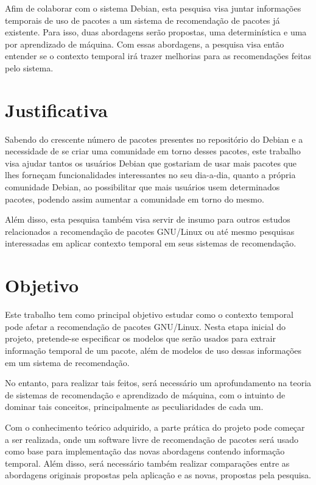 Afim de colaborar com o sistema Debian, esta pesquisa visa juntar informações
temporais de uso de pacotes a um sistema de recomendação de pacotes já existente.
Para isso, duas abordagens serão propostas, uma determinística e uma por aprendizado
de máquina. Com essas abordagens, a pesquisa visa então entender se o contexto temporal
irá trazer melhorias para as recomendações feitas pelo sistema.

\section{Justificativa}

Sabendo do crescente número de pacotes presentes no repositório do Debian e a
necessidade de se criar uma comunidade em torno desses pacotes, este trabalho
visa ajudar tantos os usuários Debian que gostariam de usar mais pacotes que
lhes forneçam funcionalidades interessantes no seu dia-a-dia, quanto a própria
comunidade Debian, ao possibilitar que mais usuários usem determinados pacotes,
podendo assim aumentar a comunidade em torno do mesmo.

Além disso, esta pesquisa também visa servir de insumo para outros estudos
relacionados a recomendação de pacotes GNU/Linux ou até mesmo pesquisas
interessadas em aplicar contexto temporal em seus sistemas de recomendação.

\section{Objetivo}

Este trabalho tem como principal objetivo estudar como o contexto temporal pode
afetar a recomendação de pacotes GNU/Linux. Nesta etapa inicial do projeto,
pretende-se especificar os modelos que serão usados para extrair informação
temporal de um pacote, além de modelos de uso dessas informações em um sistema
de recomendação.

No entanto, para realizar tais feitos, será necessário um aprofundamento na
teoria de sistemas de recomendação e aprendizado de máquina, com o intuinto de
dominar tais conceitos, principalmente as peculiaridades de cada um.

Com o conhecimento teórico adquirido, a parte prática do projeto pode começar a
ser realizada, onde um software livre de recomendação de pacotes será usado como
base para implementação das novas abordagens contendo informação temporal. Além
disso, será necessário também realizar comparações entre as abordagens originais
propostas pela aplicação e as novas, propostas pela pesquisa.

